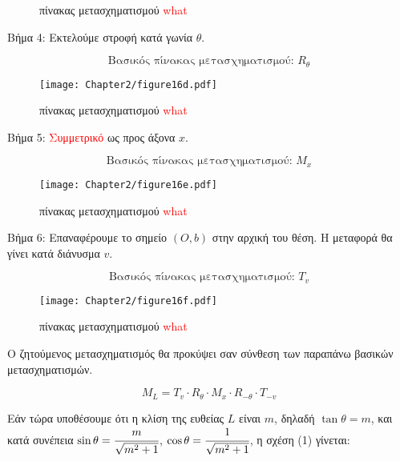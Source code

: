 \begin{solution}
\begin{figure}[h!]
\begin{center}
	\end{center}
	\caption{πίνακας μετασχηματισμού \textcolor{red}{what}}
\end{figure}

Βήμα 4: Εκτελούμε στροφή κατά γωνία $\theta$.

\[
\text{Βασικός πίνακας μετασχηματισμού: } R_\theta
\]

\begin{figure}[h!]
	\begin{center}

		    \texttt{[image: Chapter2/figure16d.pdf]}

	\end{center}
	\caption{πίνακας μετασχηματισμού \textcolor{red}{what}}
\end{figure}


Βήμα 5: \textcolor{red}{Συμμετρικό} ως προς άξονα $x$.

\[
\text{Βασικός πίνακας μετασχηματισμού: } M_x
\]


\begin{figure}[h!]
	\begin{center}

		    \texttt{[image: Chapter2/figure16e.pdf]}

	\end{center}
	\caption{πίνακας μετασχηματισμού \textcolor{red}{what}}
\end{figure}


Βήμα 6: Επαναφέρουμε το σημείο $(O, b)$ στην αρχική του θέση. Η μεταφορά θα γίνει κατά διάνυσμα $v$.


\[
\text{Βασικός πίνακας μετασχηματισμού: } T_v
\]

\begin{figure}[h!]
	\begin{center}

		    \texttt{[image: Chapter2/figure16f.pdf]}

	\end{center}
	\caption{πίνακας μετασχηματισμού \textcolor{red}{what}}
\end{figure}

Ο ζητούμενος μετασχηματισμός θα προκύψει σαν σύνθεση των παραπάνω βασικών μετασχηματισμών.

\[
M_L = T_v \cdot R_{\theta} \cdot M_x \cdot R_{-\theta} \cdot T_{-v} \tag{1}
\]

Εάν τώρα υποθέσουμε ότι η κλίση της ευθείας $L$ είναι $m$, δηλαδή $\tan\theta = m$, και κατά συνέπεια $\sin\theta = \cfrac{m}{\sqrt{m^2+1}}$, $\cos\theta = \cfrac{1}{\sqrt{m^2+1}}$, η σχέση (1) γίνεται:


\end{solution}

